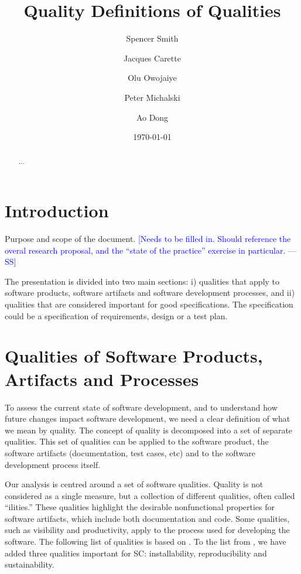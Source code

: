 \documentclass[letterpaper,cleveref]{lipics-v2019}
\title{Quality Definitions of Qualities}
\author{Spencer Smith}{McMaster University, Canada}{smiths@mcmaster.ca}{}{}
\author{Jacques Carette}{McMaster University, Canada}{carette@mcmaster.ca}{}{}
\author{Olu Owojaiye}{McMaster University, Canada}{}{}{}
\author{Peter Michalski}{McMaster University, Canada}{}{}{}
\author{Ao Dong}{McMaster University, Canada}{}{}{}
\date{\today}
\newcommand{\authornote}[3]{\textcolor{#1}{[#3 ---#2]}}
\newcommand{\authornote}[3]{}
\newcommand{\wss}[1]{\authornote{blue}{SS}{#1}} %
\begin{document}
\maketitle

\begin{abstract}
  ...
\end{abstract}

\tableofcontents

\section{Introduction} \label{SecIntroduction}

Purpose and scope of the document.  \wss{Needs to be filled in.  Should
  reference the overal research proposal, and the ``state of the practice''
  exercise in particular.}

The presentation is divided into two main sections: i) qualities that apply to software products,
software artifacts and software development processes, and ii) qualities that
are considered important for good specifications.  The specification could be a
specification of requirements, design or a test plan.  

\section{Qualities of Software Products, Artifacts and
  Processes} \label{SecQualities}

To assess the current state of software development, and to understand how
future changes impact software development, we need a clear definition of what
we mean by quality.  The concept of quality is decomposed into a set of separate
qualities.  This set of qualities can be applied to the software product, the
software artifacts (documentation, test cases, etc) and to the software
development process itself.

Our analysis is centred around a set of software qualities.  Quality is not
considered as a single measure, but a collection of different qualities, often
called ``ilities.''  These qualities highlight the desirable nonfunctional
properties for software artifacts, which include both documentation and
code. Some qualities, such as visibility and productivity, apply to the process
used for developing the software. The following list of qualities is based on
\cite{GhezziEtAl2003}. To the list from \cite{GhezziEtAl2003}, we have added
three qualities important for SC: installability, reproducibility and
sustainability.
\end{document}
